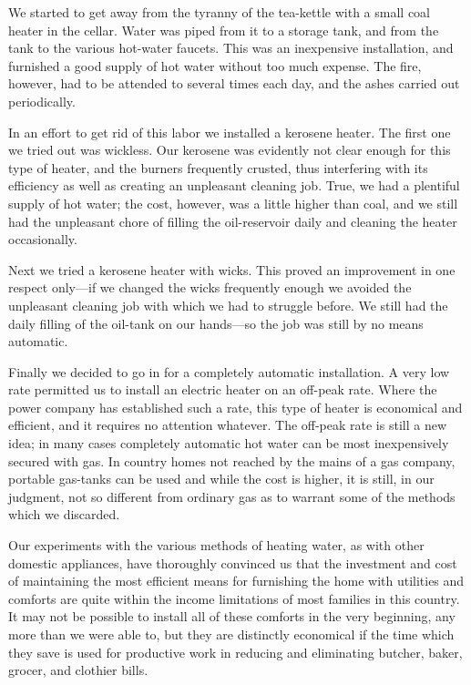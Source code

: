 \documentclass{book}
\begin{document}
We started to get away from the tyranny of the tea-kettle with a small coal heater in the cellar. Water was piped from it to a storage tank, and from the tank to the various hot-water faucets. This was an inexpensive installation, and furnished a good supply of hot water without too much expense. The fire, however, had to be attended to several times each day, and the ashes carried out periodically.

In an effort to get rid of this labor we installed a kerosene heater. The first one we tried out was wickless. Our kerosene was evidently not clear enough for this type of heater, and the burners frequently crusted, thus interfering with its efficiency as well as creating an unpleasant cleaning job. True, we had a plentiful supply of hot water; the cost, however, was a little higher than coal, and we still had the unpleasant chore of filling the oil-reservoir daily and cleaning the heater occasionally.

Next we tried a kerosene heater with wicks. This proved an improvement in one respect only—if we changed the wicks frequently enough we avoided the unpleasant cleaning job with which we had to struggle before. We still had the daily filling of the oil-tank on our hands—so the job was still by no means automatic.

Finally we decided to go in for a completely automatic installation. A very low rate permitted us to install an electric heater on an off-peak rate. Where the power company has established such a rate, this type of heater is economical and efficient, and it requires no attention whatever. The off-peak rate is still a new idea; in many cases completely automatic hot water can be most inexpensively secured with gas. In country homes not reached by the mains of a gas company, portable gas-tanks can be used and while the cost is higher, it is still, in our judgment, not so different from ordinary gas as to warrant some of the methods which we discarded.

Our experiments with the various methods of heating water, as with other domestic appliances, have thoroughly convinced us that the investment and cost of maintaining the most efficient means for furnishing the home with utilities and comforts are quite within the income limitations of most families in this country. It may not be possible to install all of these comforts in the very beginning, any more than we were able to, but they are distinctly economical if the time which they save is used for productive work in reducing and eliminating butcher, baker, grocer, and clothier bills.
\end{document}
